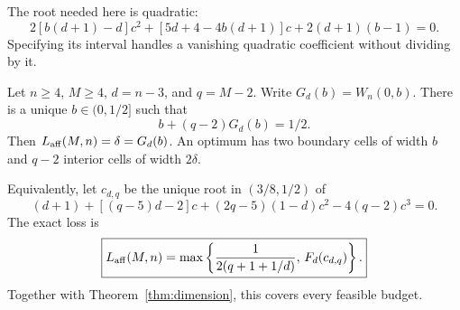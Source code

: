 The root needed here is quadratic:
\begin{equation}\label{eq:boundary-quadratic}
2[b(d+1)-d]c^2+[5d+4-4b(d+1)]c+2(d+1)(b-1)=0.
\end{equation}
Specifying its interval handles a vanishing quadratic coefficient without dividing by it.

\begin{theorem}\label{thm:budget}
Let $n\ge4$, $M\ge4$, $d=n-3$, and $q=M-2$. Write $G_d(b)=W_n(0,b)$. There is a unique $b\in(0,1/2]$ such that
\begin{equation}\label{eq:balance}
b+(q-2)G_d(b)=1/2.
\end{equation}
Then $L_{\mathrm{aff}}(M,n)=\delta=G_d(b)$. An optimum has two boundary cells of width $b$ and $q-2$ interior cells of width $2\delta$.

Equivalently, let $c_{d,q}$ be the unique root in $(3/8,1/2)$ of
\begin{equation}\label{eq:budget-cubic}
(d+1)+[(q-5)d-2]c+(2q-5)(1-d)c^2-4(q-2)c^3=0.
\end{equation}
The exact loss is
\begin{equation}\label{eq:budget-law}
\boxed{\displaystyle
L_{\mathrm{aff}}(M,n)=\max\left\{\frac1{2(q+1+1/d)},\,F_d(c_{d,q})\right\}.}
\end{equation}
Together with Theorem~\ref{thm:dimension}, this covers every feasible budget.
\end{theorem}
